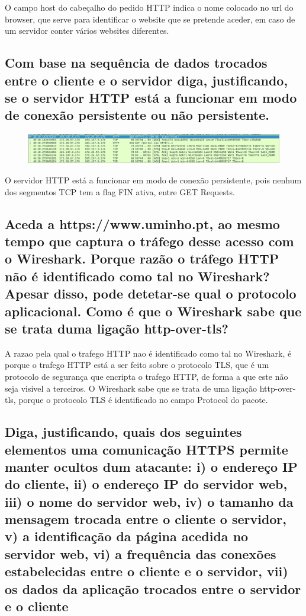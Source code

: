\documentclass{article}
\begin{document}
O campo host do cabeçalho do pedido HTTP indica o nome colocado no url do browser, que serve para identificar o website que se pretende aceder, em caso de um servidor conter vários websites diferentes.

\subsection{Com base na sequência de dados trocados entre o cliente e o servidor diga, justificando, se o servidor
HTTP está a funcionar em modo de conexão persistente ou não persistente.}

\begin{figure}[h!]
    \centering
    \includegraphics[width=1\linewidth]{images/conexao.png}
\end{figure}

O servidor HTTP está a funcionar em modo de conexão persistente, pois nenhum dos segmentos TCP tem a flag FIN ativa, entre GET Requests.

\subsection{Aceda a https://www.uminho.pt, ao mesmo tempo que captura o tráfego desse acesso com o Wireshark.
Porque razão o tráfego HTTP não é identificado como tal no Wireshark? Apesar disso, pode detetar-se
qual o protocolo aplicacional. Como é que o Wireshark sabe que se trata duma ligação http-over-tls?}

A razao pela qual o trafego HTTP nao é identificado como tal no Wireshark, é porque o trafego HTTP está a ser feito sobre o protocolo TLS, que é um protocolo de segurança que encripta o trafego HTTP, de forma a que este não seja visivel a terceiros. O Wireshark sabe que se trata de uma ligação http-over-tls, porque o protocolo TLS é identificado no campo Protocol do pacote.

\subsection{Diga, justificando, quais dos seguintes elementos uma comunicação HTTPS permite manter ocultos dum
atacante: i) o endereço IP do cliente, ii) o endereço IP do servidor web, iii) o nome do servidor web, iv) o
tamanho da mensagem trocada entre o cliente o servidor, v) a identificação da página acedida no servidor
web, vi) a frequência das conexões estabelecidas entre o cliente e o servidor, vii) os dados da aplicação
trocados entre o servidor e o cliente}
\end{document}

